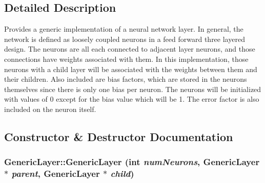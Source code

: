 \subsection{Detailed Description}
Provides a generic implementation of a neural network layer. In general, the network is defined as loosely coupled neurons in a feed forward three layered design. The neurons are all each connected to adjacent layer neurons, and those connections have weights associated with them. In this implementation, those neurons with a child layer will be associated with the weights between them and their children. Also included are bias factors, which are stored in the neurons themselves since there is only one bias per neuron. The neurons will be initialized with values of 0 except for the bias value which will be 1. The error factor is also included on the neuron itself. 

\subsection{Constructor \& Destructor Documentation}
\hypertarget{classGenericLayer_03c284e00a6a3e261665f46dff41a9ea}{
\subsubsection{\setlength{\rightskip}{0pt plus 5cm}GenericLayer::GenericLayer (int {\em numNeurons}, {\bf GenericLayer} $\ast$ {\em parent}, {\bf GenericLayer} $\ast$ {\em child})}}
\label{classGenericLayer_03c284e00a6a3e261665f46dff41a9ea}


